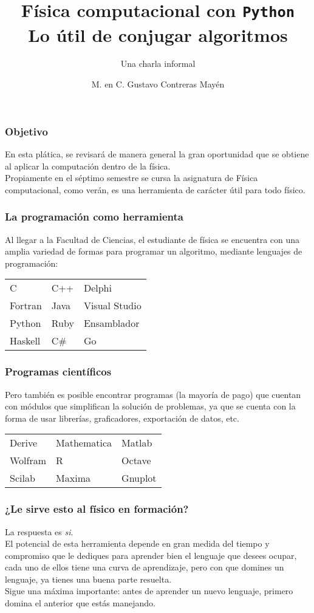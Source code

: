 \documentclass[12pt]{beamer}
\newcommand{\python}{\texttt{Python}}
\begin{document}
\title{Física computacional con \python \\ Lo útil de conjugar algoritmos}
\subtitle{Una charla informal}
\author[]{M. en C. Gustavo Contreras Mayén}
\date{ }
\maketitle
\fontsize{14}{14}\selectfont
{}
\begin{frame}
\frametitle{Objetivo}
En esta plática, se revisará de manera general la gran oportunidad que se obtiene al aplicar la computación dentro de la física.
\\
\bigskip
Propiamente en el séptimo semestre se cursa la asignatura de Física computacional, como verán, es una herramienta de carácter útil para todo físico.
\end{frame}
\begin{frame}
\frametitle{La programación como herramienta}
Al llegar a la Facultad de Ciencias, el estudiante de física se encuentra con una amplia variedad de formas para programar un algoritmo, mediante lenguajes de programación:
\begin{center}
\begin{tabular}{l l l}
C & C++ & Delphi \\
Fortran & Java & Visual Studio \\
Python & Ruby & Ensamblador \\
Haskell & C\# & Go
\end{tabular}
\end{center}
\end{frame}
\begin{frame}
\frametitle{Programas científicos}
Pero también es posible encontrar programas (la mayoría de pago) que cuentan con módulos que simplifican la solución de problemas, ya que se cuenta con la forma de usar librerías, graficadores, exportación de datos, etc.
\begin{center}
\begin{tabular}{l l l}
Derive & Mathematica & Matlab \\
Wolfram & R & Octave \\
Scilab & Maxima & Gnuplot
\end{tabular}
\end{center}
\end{frame}
\begin{frame}
\frametitle{¿Le sirve esto al físico en formación?}
\pause
La respuesta es \emph{si}.
\pause
\\
\bigskip
El potencial de esta herramienta depende en gran medida del tiempo y compromiso que le dediques para aprender bien el lenguaje que desees ocupar, cada uno de ellos tiene una curva de aprendizaje, pero con que domines un lenguaje, ya tienes una buena parte resuelta.
\\
\bigskip
Sigue una máxima importante: antes de aprender un nuevo lenguaje, primero domina el anterior que estás manejando.
\end{frame}
\end{document}
